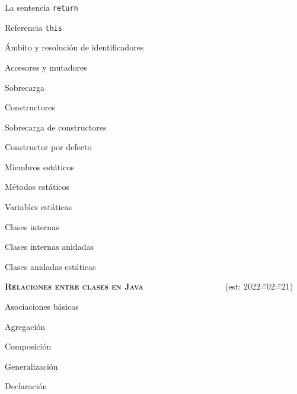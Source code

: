 \begin{longenum}
\begin{longenum}
\begin{longenum}
\begin{longenum}
                \item La sentencia \texttt{return}
                \item Referencia \texttt{this}
                \item Ámbito y resolución de identificadores
                \item Accesores y mutadores
                \item Sobrecarga
                \item Constructores
                \begin{longenum}
                    \item Sobrecarga de constructores
                    \item Constructor por defecto
                \end{longenum}
            \end{longenum}
        \end{longenum}
        \item Miembros estáticos
        \begin{longenum}
            \item Métodos estáticos
            \item Variables estáticas
        \end{longenum}
        \item Clases internas
        \begin{longenum}
            \item Clases internas anidadas
            \item Clases anidadas estáticas
        \end{longenum}
    \end{longenum}
    \item \textbf{\textsc{Relaciones entre clases en Java}} \ \ \ \ \ \ \ \ \ \ \ \ \ \ \ \ \ \ \ (est: 2022\==02\==21)
    \begin{longenum}
        \item Asociaciones básicas
        \begin{longenum}
            \item Agregación
            \item Composición
        \end{longenum}
        \item Generalización
        \begin{longenum}
            \item Declaración

\end{longenum}
\end{longenum}
\end{longenum}
